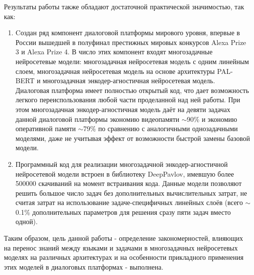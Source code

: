 Результаты работы также обладают достаточной практической значимостью, так как:
\begin{enumerate}
   \item Cоздан ряд компонент диалоговой платформы мирового уровня, впервые в России вышедшей в полуфинал престижных мировых конкурсов Alexa Prize 3 и Alexa Prize 4. В число этих компонент входят многозадачные нейросетевые модели: многозадачная нейросетевая модель с одним линейным слоем, многозадачная нейросетевая модель на основе архитектуры PAL-BERT и многозадачная энкодер-агностичная нейросетевая модель. Диалоговая платформа имеет полностью открытый код, что дает возможность легкого переиспользования любой части проделанной над ней работы. При этом многозадачная энкодер-агностичная модель даёт на девяти задачах данной диалоговой платформы экономию видеопамяти $\sim$90\% и экономию оперативной памяти $\sim$79\% по сравнению с аналогичными однозадачными моделями, даже не учитывая эффект от возможности быстрой замены базовой модели.
   \item Программный код для реализации многозадачной энкодер-агностичной нейросетевой модели встроен в библиотеку DeepPavlov, имевшую более 500000 скачиваний на момент встраивания кода. Данные модели позволяют решить большое число задач без дополнительных вычислительных затрат, не считая затрат на использование задаче-специфичных линейных слоёв (всего $\sim$0.1\% дополнительных параметров для решения сразу пяти задач вместо одной).
\end{enumerate}

Таким образом, цель данной работы - определение закономерностей, влияющих на перенос знаний между языками и задачами в многозадачных нейросетевых моделях на различных архитектурах и на особенности прикладного применения этих моделей в диалоговых платформах - выполнена. 